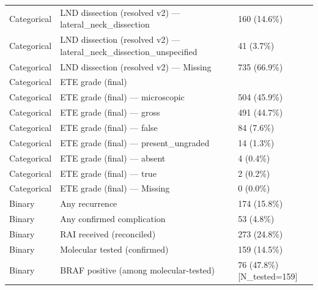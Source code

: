 \begin{table}[htbp]
\begin{tabular}{lll}
Categorical & LND dissection (resolved v2) — lateral\_neck\_dissection & 160 (14.6\%) \\
Categorical & LND dissection (resolved v2) — lateral\_neck\_dissection\_unspecified & 41 (3.7\%) \\
Categorical & LND dissection (resolved v2) — Missing & 735 (66.9\%) \\
Categorical & ETE grade (final) &  \\
Categorical & ETE grade (final) — microscopic & 504 (45.9\%) \\
Categorical & ETE grade (final) — gross & 491 (44.7\%) \\
Categorical & ETE grade (final) — false & 84 (7.6\%) \\
Categorical & ETE grade (final) — present\_ungraded & 14 (1.3\%) \\
Categorical & ETE grade (final) — absent & 4 (0.4\%) \\
Categorical & ETE grade (final) — true & 2 (0.2\%) \\
Categorical & ETE grade (final) — Missing & 0 (0.0\%) \\
Binary & Any recurrence & 174 (15.8\%) \\
Binary & Any confirmed complication & 53 (4.8\%) \\
Binary & RAI received (reconciled) & 273 (24.8\%) \\
Binary & Molecular tested (confirmed) & 159 (14.5\%) \\
Binary & BRAF positive (among molecular-tested) & 76 (47.8\%) [N\_tested=159] \\
\bottomrule
\end{tabular}
\end{table}
